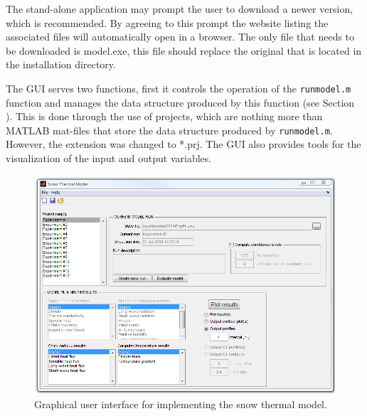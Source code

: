The stand-alone application may prompt the user to download a newer version, which is recommended.  By agreeing to this prompt the website listing the associated files will automatically open in a browser.  The only file that needs to be downloaded is model.exe, this file should replace the original that is located in the installation directory.

The GUI serves two functions, first it controls the operation of the \texttt{runmodel.m} function and manages the data structure produced by this function (see Section ).  This is done through the use of projects, which are nothing more than MATLAB mat-files that store the data structure produced by \texttt{runmodel.m}. However, the extension was changed to *.prj.  The GUI also provides tools for the visualization of the input and output variables.

\begin{figure}[ht!]\centering
\includegraphics[width=\linewidth]{figures/gui.png}
\caption{Graphical user interface for implementing the snow thermal model.}
\label{TM:fig:gui}
\end{figure}

